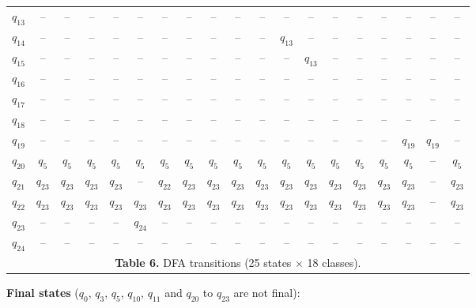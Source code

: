 \documentclass[12pt,letterpaper]{article}
\begin{document}
\begin{table}[H]
{\begin{tabular}{@{}l *{18}{c}@{}}
$q_{13}$ & -- & -- & -- & -- & -- & -- & -- & -- & -- & -- & -- & -- & -- & -- & -- & -- & -- & -- \\
$q_{14}$ & -- & -- & -- & -- & -- & -- & -- & -- & -- & -- & $q_{13}$ & -- & -- & -- & -- & -- & -- & -- \\
$q_{15}$ & -- & -- & -- & -- & -- & -- & -- & -- & -- & -- & -- & $q_{13}$ & -- & -- & -- & -- & -- & -- \\
$q_{16}$ & -- & -- & -- & -- & -- & -- & -- & -- & -- & -- & -- & -- & -- & -- & -- & -- & -- & -- \\
$q_{17}$ & -- & -- & -- & -- & -- & -- & -- & -- & -- & -- & -- & -- & -- & -- & -- & -- & -- & -- \\
$q_{18}$ & -- & -- & -- & -- & -- & -- & -- & -- & -- & -- & -- & -- & -- & -- & -- & -- & -- & -- \\
$q_{19}$ & -- & -- & -- & -- & -- & -- & -- & -- & -- & -- & -- & -- & -- & -- & -- & $q_{19}$ & $q_{19}$ & -- \\
$q_{20}$ & $q_{5}$ & $q_{5}$ & $q_{5}$ & $q_{5}$ & $q_{5}$ & $q_{5}$ & $q_{5}$ & $q_{5}$ & $q_{5}$ & $q_{5}$ & $q_{5}$ & $q_{5}$ & $q_{5}$ & $q_{5}$ & $q_{5}$ & $q_{5}$ & -- & $q_{5}$ \\
$q_{21}$ & $q_{23}$ & $q_{23}$ & $q_{23}$ & $q_{23}$ & -- & $q_{22}$ & $q_{23}$ & $q_{23}$ & $q_{23}$ & $q_{23}$ & $q_{23}$ & $q_{23}$ & $q_{23}$ & $q_{23}$ & $q_{23}$ & $q_{23}$ & -- & $q_{23}$ \\
$q_{22}$ & $q_{23}$ & $q_{23}$ & $q_{23}$ & $q_{23}$ & $q_{23}$ & $q_{23}$ & $q_{23}$ & $q_{23}$ & $q_{23}$ & $q_{23}$ & $q_{23}$ & $q_{23}$ & $q_{23}$ & $q_{23}$ & $q_{23}$ & $q_{23}$ & -- & $q_{23}$ \\
$q_{23}$ & -- & -- & -- & -- & $q_{24}$ & -- & -- & -- & -- & -- & -- & -- & -- & -- & -- & -- & -- & -- \\
$q_{24}$ & -- & -- & -- & -- & -- & -- & -- & -- & -- & -- & -- & -- & -- & -- & -- & -- & -- & -- \\
\bottomrule
\multicolumn{19}{c}{\vspace{2pt}\footnotesize \textbf{Table 6.} DFA transitions (25 states $\times$ 18 classes).} \\
\end{tabular}}
\end{table}

\textbf{Final states} ($q_0$, $q_3$, $q_5$, $q_{10}$, $q_{11}$ and $q_{20}$ to $q_{23}$ are not final):
\end{document}

